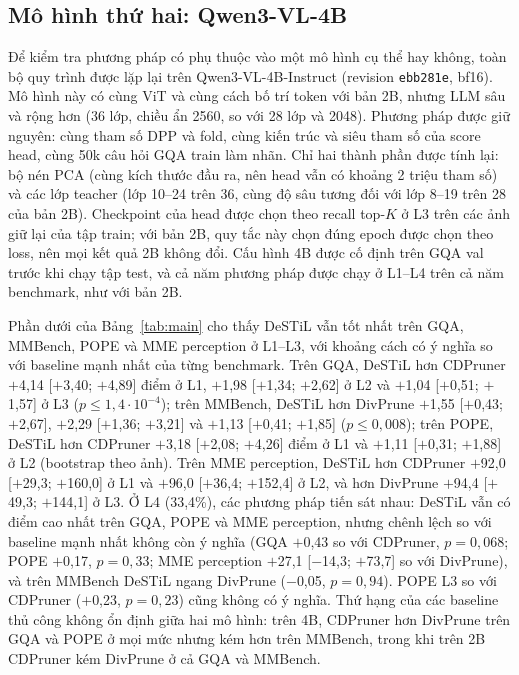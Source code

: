 \documentclass[conference]{IEEEtran}
\newcommand{\mi}{\ensuremath{-}}            %
\newcommand{\pl}{\ensuremath{+}}
\begin{document}
\subsection{Mô hình thứ hai: Qwen3-VL-4B}
\label{sec:4b}

Để kiểm tra phương pháp có phụ thuộc vào một mô hình cụ thể hay không, toàn bộ quy trình được lặp lại trên Qwen3-VL-4B-Instruct (revision \texttt{ebb281e}, bf16). Mô hình này có cùng ViT và cùng cách bố trí token với bản 2B, nhưng LLM sâu và rộng hơn (36 lớp, chiều ẩn 2560, so với 28 lớp và 2048). Phương pháp được giữ nguyên: cùng tham số DPP và fold, cùng kiến trúc và siêu tham số của score head, cùng 50k câu hỏi GQA train làm nhãn. Chỉ hai thành phần được tính lại: bộ nén PCA (cùng kích thước đầu ra, nên head vẫn có khoảng 2 triệu tham số) và các lớp teacher (lớp 10--24 trên 36, cùng độ sâu tương đối với lớp 8--19 trên 28 của bản 2B). Checkpoint của head được chọn theo recall top-$K$ ở L3 trên các ảnh giữ lại của tập train; với bản 2B, quy tắc này chọn đúng epoch được chọn theo loss, nên mọi kết quả 2B không đổi. Cấu hình 4B được cố định trên GQA val trước khi chạy tập test, và cả năm phương pháp được chạy ở L1--L4 trên cả năm benchmark, như với bản 2B.

Phần dưới của Bảng~\ref{tab:main} cho thấy DeSTiL vẫn tốt nhất trên GQA, MMBench, POPE và MME perception ở L1--L3, với khoảng cách có ý nghĩa so với baseline mạnh nhất của từng benchmark. Trên GQA, DeSTiL hơn CDPruner \pl4,14 [\pl3,40; \pl4,89] điểm ở L1, \pl1,98 [\pl1,34; \pl2,62] ở L2 và \pl1,04 [\pl0,51; \pl1,57] ở L3 ($p\le1{,}4\cdot10^{-4}$); trên MMBench, DeSTiL hơn DivPrune \pl1,55 [\pl0,43; \pl2,67], \pl2,29 [\pl1,36; \pl3,21] và \pl1,13 [\pl0,41; \pl1,85] ($p\le0{,}008$); trên POPE, DeSTiL hơn CDPruner \pl3,18 [\pl2,08; \pl4,26] điểm ở L1 và \pl1,11 [\pl0,31; \pl1,88] ở L2 (bootstrap theo ảnh). Trên MME perception, DeSTiL hơn CDPruner \pl92,0 [\pl29,3; \pl160,0] ở L1 và \pl96,0 [\pl36,4; \pl152,4] ở L2, và hơn DivPrune \pl94,4 [\pl49,3; \pl144,1] ở L3. Ở L4 (33,4\%), các phương pháp tiến sát nhau: DeSTiL vẫn có điểm cao nhất trên GQA, POPE và MME perception, nhưng chênh lệch so với baseline mạnh nhất không còn ý nghĩa (GQA \pl0,43 so với CDPruner, $p=0{,}068$; POPE \pl0,17, $p=0{,}33$; MME perception \pl27,1 [\mi14,3; \pl73,7] so với DivPrune), và trên MMBench DeSTiL ngang DivPrune (\mi0,05, $p=0{,}94$). POPE L3 so với CDPruner (\pl0,23, $p=0{,}23$) cũng không có ý nghĩa. Thứ hạng của các baseline thủ công không ổn định giữa hai mô hình: trên 4B, CDPruner hơn DivPrune trên GQA và POPE ở mọi mức nhưng kém hơn trên MMBench, trong khi trên 2B CDPruner kém DivPrune ở cả GQA và MMBench.
\end{document}
